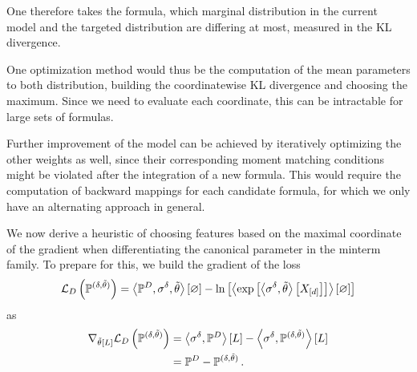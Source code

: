 

One therefore takes the formula, which marginal distribution in the current model and the targeted distribution are differing at most, measured in the KL divergence.

One optimization method would thus be the computation of the mean parameters to both distribution, building the coordinatewise KL divergence and choosing the maximum.
Since we need to evaluate each coordinate, this can be intractable for large sets of formulas.


Further improvement of the model can be achieved by iteratively optimizing the other weights as well, since their corresponding moment matching conditions might be violated after the integration of a new formula.
This would require the computation of backward mappings for each candidate formula, for which we only have an alternating approach in general.





We now derive a heuristic of choosing features based on the maximal coordinate of the gradient when differentiating the canonical parameter in the minterm family.
To prepare for this, we build the gradient of the loss
\begin{align*}
    \mathcal{L}_{D}\left(\mathbb{P}^{(\delta, \tilde{\theta})}\right)
    = \left\langle \mathbb{P}^{D}, \sigma^{\delta}, \tilde{\theta}\right\rangle \left[ \varnothing \right] - \ln \left[ \left\langle \mathrm{exp}\left[\left\langle \sigma^{\delta}, \tilde{\theta}\right\rangle \left[ X_{[d]} \right]\right]\right\rangle \left[ \varnothing \right] \right]
\end{align*}
as
\begin{align*}
    \nabla_{\tilde{\theta}\left[L\right]} \mathcal{L}_{D}\left(\mathbb{P}^{(\delta, \tilde{\theta})}\right)
    &= \left\langle \sigma^{\delta},\mathbb{P}^{D}\right\rangle \left[ L \right] - \left\langle \sigma^{\delta},\mathbb{P}^{(\delta, \tilde{\theta})}\right\rangle \left[ L \right] \\
    &= \mathbb{P}^{D} - \mathbb{P}^{(\delta, \tilde{\theta})} \, .
\end{align*}


